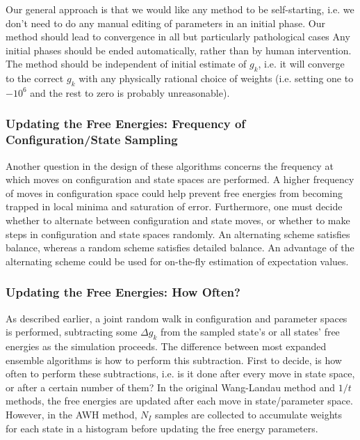 \documentclass[superscriptaddress,showkeys, nofootinbib, pre, aps]{revtex4-1}
\begin{document}
Our general approach is that we would like any method to be self-starting, i.e. we don't need to do any manual editing of parameters in an initial phase.  Our method should lead to convergence in all but particularly pathological cases  Any initial phases should be ended automatically, rather than by human intervention.  The method should be independent of initial estimate of $g_k$, i.e. it will converge to the correct $g_k$ with any physically rational choice of weights (i.e. setting one to $-10^6$ and the rest to zero is probably unreasonable).

\subsubsection{Updating the Free Energies: Frequency of Configuration/State Sampling}
Another question in the design of these algorithms concerns the frequency at which moves on configuration and state spaces are performed.  A higher frequency of moves in configuration space could help prevent free energies from becoming trapped in local minima and saturation of error.  Furthermore, one must decide whether to alternate between configuration and state moves, or whether to make steps in configuration and state spaces randomly.  An alternating scheme satisfies balance, whereas a random scheme satisfies detailed balance.  An advantage of the alternating scheme could be used for on-the-fly estimation of expectation values.


\subsubsection{Updating the Free Energies: How Often?}
As described earlier, a joint random walk in configuration and parameter spaces is performed, subtracting some $\Delta g_k$ from the sampled state's or all states' free energies as the simulation proceeds.  The difference between most expanded ensemble algorithms is how to perform this subtraction. First to decide, is how often to perform these subtractions, i.e. is it done after every move in state space, or after a certain number of them?  In the original Wang-Landau method and $1/t$ methods, the free energies are updated after each move in state/parameter space.  However, in the AWH method, $N_I$ samples are collected to accumulate weights for each state in a histogram before updating the free energy parameters.
\end{document}
